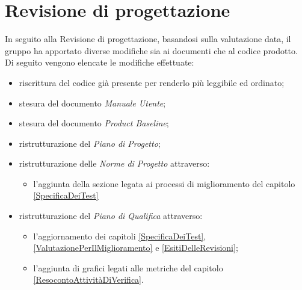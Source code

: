 \section{Revisione di progettazione}\label{EsitiDelleRevisioniRevisioneDiProgettazione}

In seguito alla Revisione di progettazione, basandosi sulla valutazione data, il gruppo ha apportato diverse modifiche sia ai documenti che al codice prodotto. Di seguito vengono elencate le modifiche effettuate:
\begin{itemize}
	\item riscrittura del codice già presente per renderlo più leggibile ed ordinato;
	\item stesura del documento \textit{Manuale Utente};
	\item stesura del documento \textit{Product Baseline};
	\item ristrutturazione del \textit{Piano di Progetto};
	\item ristrutturazione delle \textit{Norme di Progetto} attraverso:
	\begin{itemize}
		\item l'aggiunta della sezione legata ai processi di miglioramento del capitolo \ref{SpecificaDeiTest}
	\end{itemize}
	\item ristrutturazione del \textit{Piano di Qualifica} attraverso:
	\begin{itemize}
		\item l'aggiornamento dei capitoli \ref{SpecificaDeiTest}, \ref{ValutazionePerIlMiglioramento} e \ref{EsitiDelleRevisioni};
		\item l'aggiunta di grafici legati alle metriche del capitolo \ref{ResocontoAttivitàDiVerifica}.
	\end{itemize}
\end{itemize}